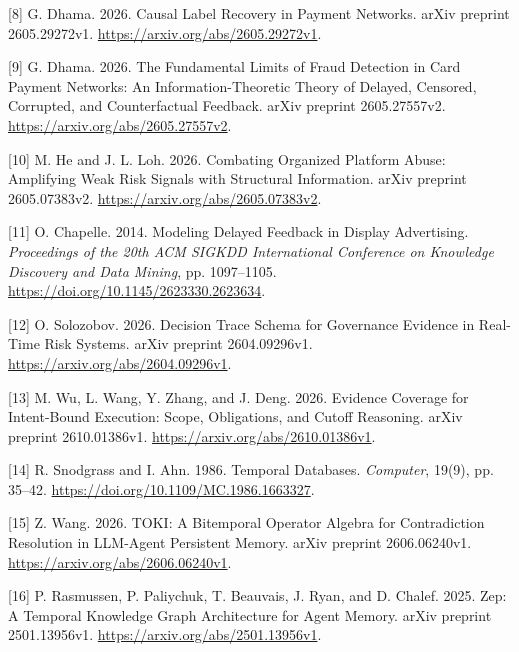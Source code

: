 \documentclass[acmlarge,review,anonymous,nonacm]{acmart}
\newlength{\cslhangindent}
\newlength{\cslentryspacingunit} %
\newenvironment{CSLReferences}[2] %
 {\bibliofont %
  \setlength{\parindent}{0pt}
  \ifodd #1
  \let\oldpar\par
  \def\par{\hangindent=\cslhangindent\oldpar}
  \fi
  \setlength{\parskip}{#2\cslentryspacingunit}
 }%
 {}
\begin{document}
\begin{CSLReferences}{1}{1}
\leavevmode{}%
{[}8{]} G. Dhama. 2026. Causal Label Recovery in Payment Networks. arXiv
preprint 2605.29272v1. \url{https://arxiv.org/abs/2605.29272v1}.

\leavevmode{}%
{[}9{]} G. Dhama. 2026. The Fundamental Limits of Fraud Detection in
Card Payment Networks: An Information-Theoretic Theory of Delayed,
Censored, Corrupted, and Counterfactual Feedback. arXiv preprint
2605.27557v2. \url{https://arxiv.org/abs/2605.27557v2}.

\leavevmode{}%
{[}10{]} M. He and J. L. Loh. 2026. Combating Organized Platform Abuse:
Amplifying Weak Risk Signals with Structural Information. arXiv preprint
2605.07383v2. \url{https://arxiv.org/abs/2605.07383v2}.

\leavevmode{}%
{[}11{]} O. Chapelle. 2014. Modeling Delayed Feedback in Display
Advertising. \emph{Proceedings of the 20th ACM SIGKDD International
Conference on Knowledge Discovery and Data Mining}, pp. 1097--1105.
\url{https://doi.org/10.1145/2623330.2623634}.

\leavevmode{}%
{[}12{]} O. Solozobov. 2026. Decision Trace Schema for Governance
Evidence in Real-Time Risk Systems. arXiv preprint 2604.09296v1.
\url{https://arxiv.org/abs/2604.09296v1}.

\leavevmode{}%
{[}13{]} M. Wu, L. Wang, Y. Zhang, and J. Deng. 2026. Evidence Coverage
for Intent-Bound Execution: Scope, Obligations, and Cutoff Reasoning.
arXiv preprint 2610.01386v1. \url{https://arxiv.org/abs/2610.01386v1}.

\leavevmode{}%
{[}14{]} R. Snodgrass and I. Ahn. 1986. Temporal Databases.
\emph{Computer}, 19(9), pp. 35--42.
\url{https://doi.org/10.1109/MC.1986.1663327}.

\leavevmode{}%
{[}15{]} Z. Wang. 2026. TOKI: A Bitemporal Operator Algebra for
Contradiction Resolution in LLM-Agent Persistent Memory. arXiv preprint
2606.06240v1. \url{https://arxiv.org/abs/2606.06240v1}.

\leavevmode{}%
{[}16{]} P. Rasmussen, P. Paliychuk, T. Beauvais, J. Ryan, and D.
Chalef. 2025. Zep: A Temporal Knowledge Graph Architecture for Agent
Memory. arXiv preprint 2501.13956v1.
\url{https://arxiv.org/abs/2501.13956v1}.


\end{CSLReferences}
\end{document}
